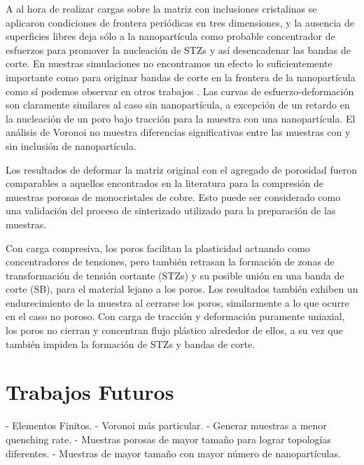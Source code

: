 A al hora de realizar cargas sobre la matriz con inclusiones cristalinas se aplicaron condiciones de frontera periódicas en tres dimensiones, y la ausencia de superficies libres deja sólo a la nanopartícula como probable concentrador de esfuerzos para promover la nucleación de STZs y así desencadenar las bandas de corte. En nuestras simulaciones no encontramos un efecto lo suficientemente importante como para originar bandas de corte en la frontera de la nanopartícula como sí podemos observar en otros trabajos \citep{albe13,brink15,adibi13,adibi14}. Las curvas de esfuerzo-deformación son claramente similares al caso sin nanopartícula, a excepción de un retardo en la nucleación de un poro bajo tracción para la muestra con una nanopartícula. El análisis de Voronoi no muestra diferencias significativas entre las muestras con y sin inclusión de nanopartícula.

Los resultados de deformar la matriz original con el agregado de porosidad fueron comparables a aquellos encontrados en la literatura \citep{yuan14} para la compresión de muestras porosas de monocristales de cobre. Esto puede ser considerado como una validación del proceso de sinterizado utilizado para la preparación de las muestras.

Con carga compresiva, los poros facilitan la plasticidad actuando como concentradores de tensiones, pero también retrasan la formación de zonas de transformación de tensión cortante (STZs) y su posible unión en una banda de corte (SB), para el material lejano a los poros. Los resultados también exhiben un endurecimiento de la muestra al cerrarse los poros, similarmente a lo que ocurre en el caso no poroso. Con carga de tracción y deformación puramente uniaxial, los poros no cierran y concentran flujo plástico alrededor de ellos, a su vez que también impiden la formación de STZs y bandas de corte.



\section{Trabajos Futuros}

- Elementos  Finitos.
- Voronoi más particular.
- Generar muestras a menor quenching rate.
- Muestras porosas de mayor tamaño para lograr topologías diferentes.
- Muestras de mayor tamaño con mayor número de nanopartículas.

